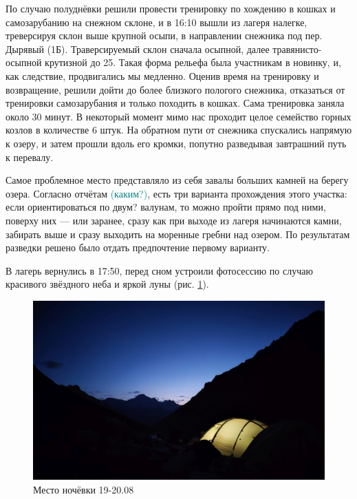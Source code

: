 По случаю полуднёвки решили провести тренировку по хождению в кошках и самозарубанию на снежном склоне, и в 16:10 вышли из лагеря налегке, треверсируя склон выше крупной осыпи, в направлении снежника под пер. Дырявый (1Б). Траверсируемый склон сначала осыпной, далее травянисто-осыпной крутизной до 25\degree. Такая форма рельефа была участникам в новинку, и, как следствие, продвигались мы медленно. Оценив время на тренировку и возвращение, решили дойти до более близкого пологого снежника, отказаться от тренировки самозарубания и только походить в кошках. Сама тренировка заняла около 30 минут. В некоторый момент мимо нас проходит целое семейство горных козлов в количестве 6 штук.
На обратном пути от снежника спускались напрямую к озеру, и затем прошли вдоль его кромки, попутно разведывая завтрашний путь к перевалу. 

Самое проблемное место представляло из себя завалы больших камней на берегу озера. Согласно отчётам \textcolor{teal}{(каким?)}, есть три варианта прохождения этого участка: если ориентироваться по двум\alert{?} валунам, то можно пройти прямо под ними, поверху них --- или заранее, сразу как при выходе из лагеря начинаются камни, забирать выше и сразу выходить на моренные гребни над озером. По результатам разведки решено было отдать предпочтение первому варианту.

В лагерь вернулись в 17:50, перед сном устроили фотосессию по случаю красивого звёздного неба и яркой луны (рис. \ref{fig:IMG_20240829_194851}).

\begin{figure}[h!]
	\centering
	\includegraphics[width=0.7\linewidth]{../pics/IMG_20240829_194851}
	\caption{Место ночёвки 19-20.08}
	\label{fig:IMG_20240829_194851}
\end{figure}

\clearpage